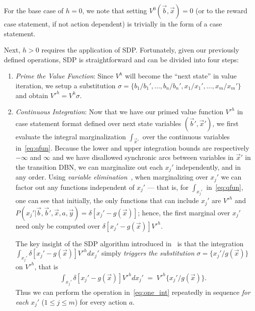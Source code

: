 \documentclass[letterpaper]{article}
\begin{document}
For the base case of $h=0$, we note that setting $V^0(\vec{b},\vec{x}) = 0$
(or to the reward case statement, if not action dependent)
is trivially in the form of a case statement.  

Next, $h > 0$ requires the application of SDP.  
Fortunately, given our previously defined
operations, SDP is straightforward and can be divided into four 
steps: 
\begin{enumerate}
\item {\it Prime the Value Function}: Since $V^{h}$ will become
the ``next state'' in value iteration, we setup a substitution
$\sigma = \{ b_1 / b_1', \ldots, b_n / b_n', x_1 / x_1', \ldots, x_m / x_m' \}$
and obtain $V'^{h} = V^{h}\sigma$.

\item {\it Continuous Integration}: Now that we have our primed value
function $V'^{h}$ in case statement format defined over next state
variables $(\vec{b}',\vec{x}')$, we first evaluate the integral
marginalization $\int_{\vec{x}'}$ over the continuous variables
in~\eqref{eq:qfun}.  Because the lower and upper integration bounds
are respectively $-\infty$ and $\infty$
and we have
disallowed synchronic arcs between variables in $\vec{x}'$ 
in the transition DBN, we can marginalize out each
$x_j'$ independently, and in any order.  Using 
\emph{variable elimination}~\cite{varelim}, when marginalizing
over $x_j'$ we can factor out any functions independent of $x_j'$ --- 
that is, for $\int_{x_j'}$ in~\eqref{eq:qfun}, 
one can see that initially, 
the only functions that can include $x_j'$ are $V'^{h}$
and $P(x_j'|\vec{b},\vec{b}',\vec{x},a,\vec{y}) = \delta[x_j' - g(\vec{x})]$; 
hence, the first marginal over $x_j'$ need only be computed over
$\delta[x_j' - g(\vec{x})] V'^{h}$.

The key insight of the SDP algorithm introduced in~\cite{sanner_uai11}
is that the integration 
$\int_{x_j'} \delta[x_j' - g(\vec{x})] V'^{h} dx_j'$ 
simply \emph{triggers the substitution} $\sigma = \{ x_j' / g(\vec{x}) \}$
on $V'^{h}$, that is
\begin{align}
\int_{x_j'} \delta[x_j' - g(\vec{x})] V'^{h} dx_j' \; = \; V'^{h} \{x_j' / g(\vec{x}) \} . \label{eq:one_int}
\end{align}
Thus we can perform the
operation in~\eqref{eq:one_int} repeatedly in sequence \emph{for each}
$x_j'$ ($1 \leq j \leq m$) for every action $a$.


\end{enumerate}
\end{document}
